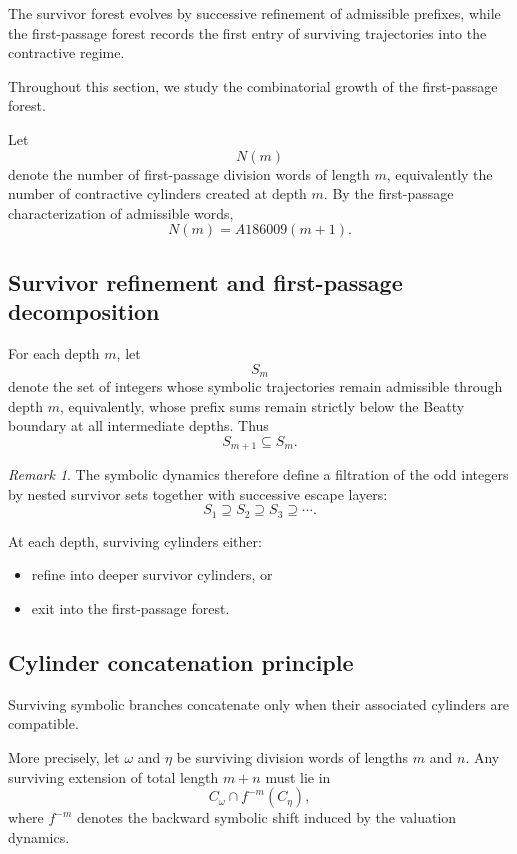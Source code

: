 \documentclass[12pt, oneside]{article}
\numberwithin{equation}{section}
\theoremstyle{definition}
\theoremstyle{plain}
\theoremstyle{remark}
\newtheorem*{remark}{Remark}
\begin{document}
The survivor forest evolves by successive refinement of admissible
prefixes, while the first-passage forest records the first entry of
surviving trajectories into the contractive regime.

Throughout this section, we study the combinatorial growth of the
first-passage forest.

Let
\[
N(m)
\]
denote the number of first-passage division words of length \(m\),
equivalently the number of contractive cylinders created at depth
\(m\). By the first-passage characterization of admissible words,
\[
N(m)=A186009(m+1).
\]

\subsection{Survivor refinement and first-passage decomposition}

For each depth \(m\), let
\[
S_m
\]
denote the set of integers whose symbolic trajectories remain
admissible through depth \(m\), equivalently, whose prefix sums
remain strictly below the Beatty boundary at all intermediate depths.
Thus
\[
S_{m+1}\subseteq S_m.
\]

\begin{remark}
The symbolic dynamics therefore define a filtration of the odd
integers by nested survivor sets together with successive escape
layers:
\[
S_1 \supseteq S_2 \supseteq S_3 \supseteq \cdots.
\]

At each depth, surviving cylinders either:
\begin{itemize}
\item refine into deeper survivor cylinders, or
\item exit into the first-passage forest.
\end{itemize}
\end{remark}

\subsection{Cylinder concatenation principle}

Surviving symbolic branches concatenate only when their associated
cylinders are compatible.

More precisely, let \(\omega\) and \(\eta\) be surviving division
words of lengths \(m\) and \(n\). Any surviving extension of total
length \(m+n\) must lie in
\[
C_\omega \cap f^{-m}(C_\eta),
\]
where \(f^{-m}\) denotes the backward symbolic shift induced by the
valuation dynamics.
\end{document}
